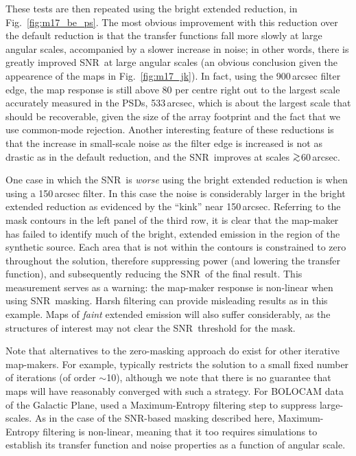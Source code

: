 \documentclass[useAMS,usenatbib,nofootinbib]{mn2e}
\newcommand{\snr}{SNR}
\def\gsim{\mathrel{\lower2.5pt\vbox{\lineskip=0pt\baselineskip=0pt
          \hbox{$>$}\hbox{$\sim$}}}}
\begin{document}
These tests are then repeated using the bright extended reduction, in
Fig.~\ref{fig:m17_be_ps}. The most obvious improvement with this
reduction over the default reduction is that the transfer functions
fall more slowly at large angular scales, accompanied by a slower
increase in noise; in other words, there is greatly improved \snr\ at
large angular scales (an obvious conclusion given the appearence of
the maps in Fig.~\ref{fig:m17_jk}). In fact, using the 900\,arcsec
filter edge, the map response is still above 80 per centre right out to
the largest scale accurately measured in the PSDs, 533\,arcsec, which
is about the largest scale that should be recoverable, given the size
of the array footprint and the fact that we use common-mode rejection.
Another interesting feature of these reductions is that the increase
in small-scale noise as the filter edge is increased is not as drastic
as in the default reduction, and the \snr\ improves at scales
$\gsim$60\,arcsec.

One case in which the \snr\ is \emph{worse} using the bright extended
reduction is when using a 150\,arcsec filter. In this case the noise
is considerably larger in the bright extended reduction as evidenced
by the ``kink'' near 150\,arcsec. Referring to the mask contours in
the left panel of the third row, it is clear that the map-maker has
failed to identify much of the bright, extended emission in the region
of the synthetic source. Each area that is not within the contours is
constrained to zero throughout the solution, therefore suppressing
power (and lowering the transfer function), and subsequently reducing
the \snr\ of the final result. This measurement serves as a warning:
the map-maker response is non-linear when using \snr\ masking. Harsh
filtering can provide misleading results as in this example. Maps of
\emph{faint} extended emission will also suffer considerably, as the
structures of interest may not clear the \snr\ threshold for the mask.

Note that alternatives to the zero-masking approach do exist for other
iterative map-makers. For example, \citet{kovacs2008} typically
restricts the solution to a small fixed number of iterations (of order
$\sim$10), although we note that there is no guarantee that maps will
have reasonably converged with such a strategy. For BOLOCAM data of
the Galactic Plane, \citet{aguirre2010} used a Maximum-Entropy
filtering step to suppress large-scales. As in the case of the
\snr-based masking described here, Maximum-Entropy filtering is
non-linear, meaning that it too requires simulations to establish its
transfer function and noise properties as a function of angular scale.
\end{document}
